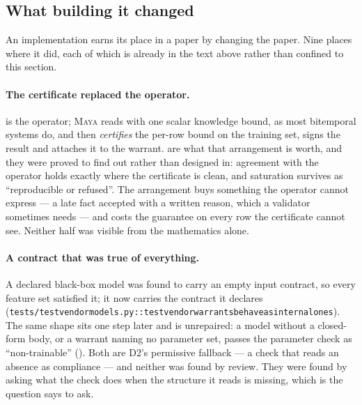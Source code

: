 \documentclass[11pt,a4paper]{article}
\renewcommand{\_}{\oldunderscore\allowbreak}
\theoremstyle{plain}
\theoremstyle{definition}
\theoremstyle{definition}
\theoremstyle{remark}
\begin{document}
\subsection{What building it changed}

An implementation earns its place in a paper by changing the paper. Nine places where it did, each of
which is already in the text above rather than confined to this section.

\paragraph{The certificate replaced the operator.}  is the operator; \textsc{Maya} reads
with one scalar knowledge bound, as most bitemporal systems do, and then \emph{certifies} the per-row
bound on the training set, signs the result and attaches it to the warrant.
 are what that arrangement is worth, and they were proved to
find out rather than designed in: agreement with the operator holds exactly where the certificate is
clean, and saturation survives as ``reproducible or refused''. The arrangement buys something the
operator cannot express --- a late fact accepted with a written reason, which a validator sometimes needs
--- and costs the guarantee on every row the certificate cannot see. Neither half was visible from the
mathematics alone.

\paragraph{A contract that was true of everything.} A declared black-box model was found to carry an
empty input contract, so every feature set satisfied it; it now carries the contract it declares
(\texttt{tests/test\_vendor\_models.py::test\_vendor\_warrants\_behave\_as\_internal\_ones}). The same
shape sits one step later and is unrepaired: a model without a closed-form body, or a warrant naming no
parameter set, passes the parameter check as ``non-trainable'' (). Both are D2's
permissive fallback --- a check that reads an absence as compliance --- and neither was found by review.
They were found by asking what the check does when the structure it reads is missing, which is the
question  says to ask.
\end{document}

